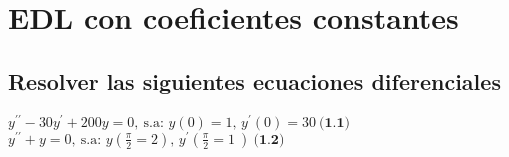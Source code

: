 \documentclass[letterpaper, 12pt]{article}
\begin{document}
\thispagestyle{fancy}
\section*{EDL con coeficientes constantes}
\subsection*{Resolver las siguientes ecuaciones diferenciales}
\justify
{\large
\(y^{\prime\prime}-30y^{\prime}+200y=0,\: \text{s.a: } y(0)=1,\, y^{\prime}(0)=30\:\textbf{(1.1)}\)\\\newline
\(y^{\prime\prime}+y=0,\: \text{s.a: } y\left(\frac{\pi}{2}=2\right),\, y^{\prime}\left(\frac{\pi}{2}=1\: \right)\:\textbf{(1.2)}\)\\\newline}
\end{document}
